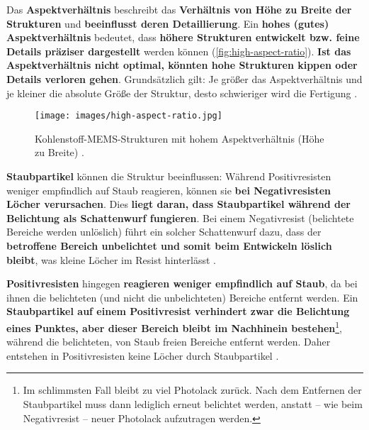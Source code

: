 \documentclass{article} %
\begin{document}
\vspace{1em}

Das \textbf{Aspektverhältnis} beschreibt das \textbf{Verhältnis von Höhe zu Breite der Strukturen} und \textbf{beeinflusst deren Detaillierung}. Ein \textbf{hohes (gutes) Aspektverhältnis} bedeutet, dass \textbf{höhere Strukturen entwickelt bzw. feine Details präziser dargestellt} werden können (\autoref{fig:high-aspect-ratio}). \textbf{Ist das Aspektverhältnis nicht optimal, könnten hohe Strukturen kippen oder Details verloren gehen}. Grundsätzlich gilt: Je größer das Aspektverhältnis und je kleiner die absolute Größe der Struktur, desto schwieriger wird die Fertigung \cite{madou2002, wolf2000, gerald2006, wikipedia_aspektverhaeltnis}.

\begin{figure}[htb!]
    \centering
    \texttt{[image: images/high-aspect-ratio.jpg]} %
    \captionsetup{labelfont=bf, width=.85\textwidth} %
    \caption{Kohlenstoff-MEMS-Strukturen mit hohem Aspektverhältnis (Höhe zu Breite) \cite{carbonMEMS}.}
    \label{fig:high-aspect-ratio}
\end{figure}

\vspace{1em}

\textbf{Staubpartikel} können die Struktur beeinflussen: Während Positivresisten weniger empfindlich auf Staub reagieren, können sie \textbf{bei Negativresisten Löcher verursachen}. Dies \textbf{liegt daran, dass Staubpartikel während der Belichtung als Schattenwurf fungieren}. Bei einem Negativresist (belichtete Bereiche werden unlöslich) führt ein solcher Schattenwurf dazu, dass der \textbf{betroffene Bereich unbelichtet und somit beim Entwickeln löslich bleibt}, was kleine Löcher im Resist hinterlässt \cite{madou2002, sciencedirect_photoresist}.

\textbf{Positivresisten} hingegen \textbf{reagieren weniger empfindlich auf Staub}, da bei ihnen die belichteten (und nicht die unbelichteten) Bereiche entfernt werden. Ein \textbf{Staubpartikel auf einem Positivresist verhindert zwar die Belichtung eines Punktes, aber dieser Bereich bleibt im Nachhinein bestehen}\footnote{Im schlimmsten Fall bleibt zu viel Photolack zurück. Nach dem Entfernen der Staubpartikel muss dann lediglich erneut belichtet werden, anstatt -- wie beim Negativresist -- neuer Photolack aufzutragen werden.}, während die belichteten, von Staub freien Bereiche entfernt werden. Daher entstehen in Positivresisten keine Löcher durch Staubpartikel \cite{wias_photoresist}.
\end{document}
